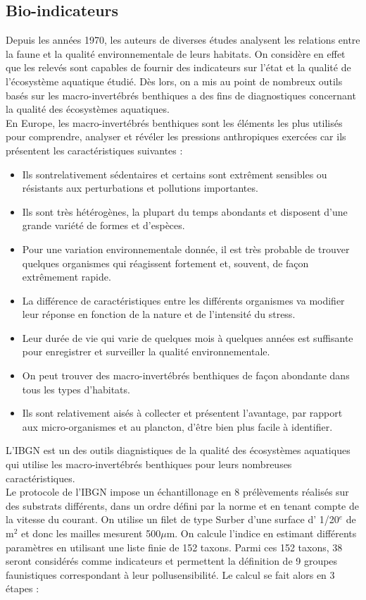 \documentclass[10pt, article]{llncs}
\begin{document}
		\subsection{Bio-indicateurs}
			Depuis les années 1970, les auteurs de diverses études \cite{archaimbault_indice_2010} analysent les relations entre la faune et la qualité environnementale de leurs habitats. On considère en effet que les relevés sont capables de fournir des indicateurs sur l'état et la qualité de l'écosystème aquatique étudié. Dès lors, on a mis au point de nombreux outils basés sur les macro-invertébrés benthiques a des fins de diagnostiques concernant la qualité des écosystèmes aquatiques.\\
			En Europe, les macro-invertébrés benthiques sont les éléments les plus utilisés pour comprendre, analyser et révéler les pressions anthropiques exercées car ils présentent les caractéristiques suivantes :
			\begin{itemize}
				\item Ils sontrelativement sédentaires et certains sont extrêment sensibles ou résistants aux perturbations et pollutions importantes.
				\item Ils sont très hétérogènes, la plupart du temps abondants et disposent d'une grande variété de formes et d'espèces.
				\item Pour une variation environnementale donnée, il est très probable de trouver quelques organismes qui réagissent fortement et, souvent, de façon extrêmement rapide.
				\item La différence de caractéristiques entre les différents organismes va modifier leur réponse en fonction de la nature et de l'intensité du stress.
				\item Leur durée de vie qui varie de quelques mois à quelques années est suffisante pour enregistrer et surveiller la qualité environnementale.
				\item On peut trouver des macro-invertébrés benthiques de façon abondante dans tous les types d'habitats.
				\item Ils sont relativement aisés à collecter et présentent l'avantage, par rapport aux micro-organismes et au plancton, d'être bien plus facile à identifier.
			\end{itemize}
			L'IBGN est un des outils diagnistiques de la qualité des écosystèmes aquatiques qui utilise les macro-invertébrés benthiques pour leurs nombreuses caractéristiques. \\
			Le protocole de l'IBGN impose un échantillonage en 8 prélèvements réalisés sur des substrats différents, dans un ordre défini par la norme et en tenant compte de la vitesse du courant. On utilise un filet de type Surber d'une surface d' 1/20$^e$ de m$^2$ et donc les mailles mesurent 500$\mu$m. On calcule l'indice en estimant différents paramètres en utilisant une liste finie de 152 taxons. Parmi ces 152 taxons, 38 seront considérés comme indicateurs et permettent la définition de 9 groupes faunistiques correspondant à leur pollusensibilité. Le calcul se fait alors en 3 étapes :
\end{document}
